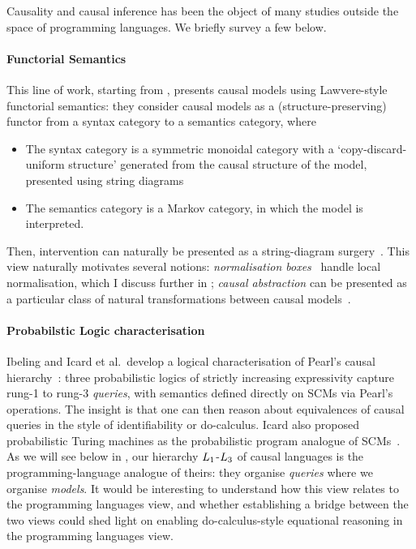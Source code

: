 \documentclass[11pt,a4paper]{article}
\begin{document}
Causality and causal inference has been the object of many studies outside the space of programming languages. We briefly survey a few below.

\paragraph{Functorial Semantics} This line of work, starting from \cite{jacobs2019causal}, presents causal models using Lawvere-style  functorial semantics: they consider causal models as a (structure-preserving) functor from a syntax category to a semantics category, where 
\begin{itemize}
    \item The syntax category is a symmetric monoidal category with a `copy-discard-uniform structure' generated from the causal structure of the model, presented using string diagrams
    \item The semantics category is a Markov category, in which the model is interpreted.
\end{itemize}
Then, intervention can naturally be presented as a string-diagram surgery~\cite{jacobs2019causal}. This view naturally motivates several notions: \emph{normalisation boxes}~\cite{jacobsszelesstein2025inference,lorenz2023causalmodelsstringdiagrams} handle local normalisation, which I discuss further in ; \emph{causal abstraction} can be presented as a particular class of natural transformations between causal models~\cite{lorenztull2026abstraction, englberger2025causalabstractionscategoricallyunified}. 

\paragraph{Probabilstic Logic characterisation} Ibeling and Icard et al.\ develop a logical characterisation of Pearl's causal hierarchy~\cite{ibeling2020hierarchy}: three probabilistic logics of strictly increasing expressivity capture rung-1 to rung-3 \emph{queries}, with semantics defined directly on SCMs via Pearl's operations. The insight is that one can then reason about equivalences of causal queries in the style of identifiability or do-calculus. 
Icard also proposed probabilistic Turing machines as the probabilistic program analogue of SCMs~\cite{icard2017programs,ibeling2019openuniverse}. As we will see below in , our hierarchy $L_1$-$L_3$ of causal languages is the programming-language analogue of theirs: they organise \emph{queries} where we organise \emph{models}. It would be interesting to understand how this view relates to the programming languages view, and whether establishing a bridge between the two views could shed light on enabling do-calculus-style equational reasoning in the programming languages view. 
\end{document}

